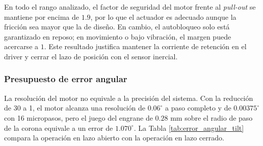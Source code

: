 \documentclass[../../General.tex]{subfiles}
\begin{document}
En todo el rango analizado, el factor de seguridad del motor frente al \textit{pull-out} se mantiene por encima de $1.9$, por lo que el actuador es adecuado aunque la fricción sea mayor que la de diseño. En cambio, el autobloqueo solo está garantizado en reposo; en movimiento o bajo vibración, el margen puede acercarse a $1$. Este resultado justifica mantener la corriente de retención en el driver y cerrar el lazo de posición con el sensor inercial.

\subsubsection{Presupuesto de error angular}

La resolución del motor no equivale a la precisión del sistema. Con la reducción de 30 a 1, el motor alcanza una resolución de $0.06^\circ$ a paso completo y de $0.00375^\circ$ con 16 micropasos, pero el juego del engrane de $0.28\text{ mm}$ sobre el radio de paso de la corona equivale a un error de $1.070^\circ$. La Tabla \ref{tab:error_angular_tilt} compara la operación en lazo abierto con la operación en lazo cerrado.
\end{document}
